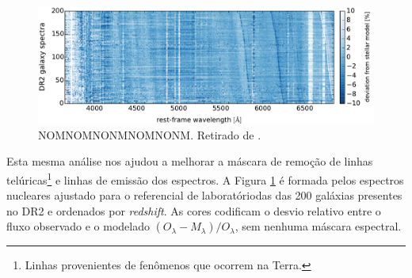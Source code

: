 \begin{figure}
	\centering
	\includegraphics[scale=0.5]{figuras/DR2_stacked_residuals.pdf}
	\caption[Espectros residuais nucleares das galáxias do DR2.]
	{NOMNOMNONMNOMNONM. Retirado de \citet{GarciaBenito.etal.2015a}.}
	\label{fig:fnuc_stack}
\end{figure}

Esta mesma análise nos ajudou a melhorar a máscara de remoção de linhas telúricas\footnote{Linhas provenientes de fenômenos que ocorrem na Terra.} e linhas de emissão dos espectros. A Figura \ref{fig:fnuc_stack} é formada pelos espectros nucleares ajustado para o referencial de laboratóriodas das 200 galáxias presentes no DR2 e ordenados por {\em redshift}. As cores codificam o desvio relativo entre o fluxo observado e o modelado $(O_\lambda - M_\lambda)/O_\lambda$, sem nenhuma máscara espectral.

